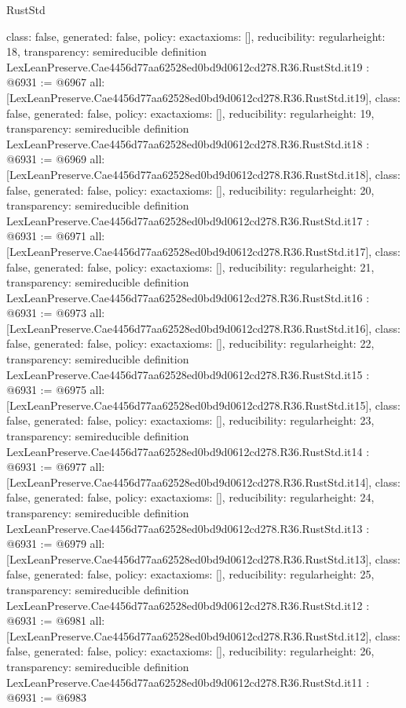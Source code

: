 \begin{lexlean}{RustStd}
\begin{coremodule}
{  class: false,
  generated: false,
  policy: exact{axioms: []},
  reducibility: regular{height: 18},
  transparency: semireducible
}
definition LexLeanPreserve.Cae4456d77aa62528ed0bd9d0612cd278.R36.RustStd.it19 : @6931 := @6967 {
  all: [LexLeanPreserve.Cae4456d77aa62528ed0bd9d0612cd278.R36.RustStd.it19],
  class: false,
  generated: false,
  policy: exact{axioms: []},
  reducibility: regular{height: 19},
  transparency: semireducible
}
definition LexLeanPreserve.Cae4456d77aa62528ed0bd9d0612cd278.R36.RustStd.it18 : @6931 := @6969 {
  all: [LexLeanPreserve.Cae4456d77aa62528ed0bd9d0612cd278.R36.RustStd.it18],
  class: false,
  generated: false,
  policy: exact{axioms: []},
  reducibility: regular{height: 20},
  transparency: semireducible
}
definition LexLeanPreserve.Cae4456d77aa62528ed0bd9d0612cd278.R36.RustStd.it17 : @6931 := @6971 {
  all: [LexLeanPreserve.Cae4456d77aa62528ed0bd9d0612cd278.R36.RustStd.it17],
  class: false,
  generated: false,
  policy: exact{axioms: []},
  reducibility: regular{height: 21},
  transparency: semireducible
}
definition LexLeanPreserve.Cae4456d77aa62528ed0bd9d0612cd278.R36.RustStd.it16 : @6931 := @6973 {
  all: [LexLeanPreserve.Cae4456d77aa62528ed0bd9d0612cd278.R36.RustStd.it16],
  class: false,
  generated: false,
  policy: exact{axioms: []},
  reducibility: regular{height: 22},
  transparency: semireducible
}
definition LexLeanPreserve.Cae4456d77aa62528ed0bd9d0612cd278.R36.RustStd.it15 : @6931 := @6975 {
  all: [LexLeanPreserve.Cae4456d77aa62528ed0bd9d0612cd278.R36.RustStd.it15],
  class: false,
  generated: false,
  policy: exact{axioms: []},
  reducibility: regular{height: 23},
  transparency: semireducible
}
definition LexLeanPreserve.Cae4456d77aa62528ed0bd9d0612cd278.R36.RustStd.it14 : @6931 := @6977 {
  all: [LexLeanPreserve.Cae4456d77aa62528ed0bd9d0612cd278.R36.RustStd.it14],
  class: false,
  generated: false,
  policy: exact{axioms: []},
  reducibility: regular{height: 24},
  transparency: semireducible
}
definition LexLeanPreserve.Cae4456d77aa62528ed0bd9d0612cd278.R36.RustStd.it13 : @6931 := @6979 {
  all: [LexLeanPreserve.Cae4456d77aa62528ed0bd9d0612cd278.R36.RustStd.it13],
  class: false,
  generated: false,
  policy: exact{axioms: []},
  reducibility: regular{height: 25},
  transparency: semireducible
}
definition LexLeanPreserve.Cae4456d77aa62528ed0bd9d0612cd278.R36.RustStd.it12 : @6931 := @6981 {
  all: [LexLeanPreserve.Cae4456d77aa62528ed0bd9d0612cd278.R36.RustStd.it12],
  class: false,
  generated: false,
  policy: exact{axioms: []},
  reducibility: regular{height: 26},
  transparency: semireducible
}
definition LexLeanPreserve.Cae4456d77aa62528ed0bd9d0612cd278.R36.RustStd.it11 : @6931 := @6983 {
}
\end{coremodule}
\end{lexlean}
